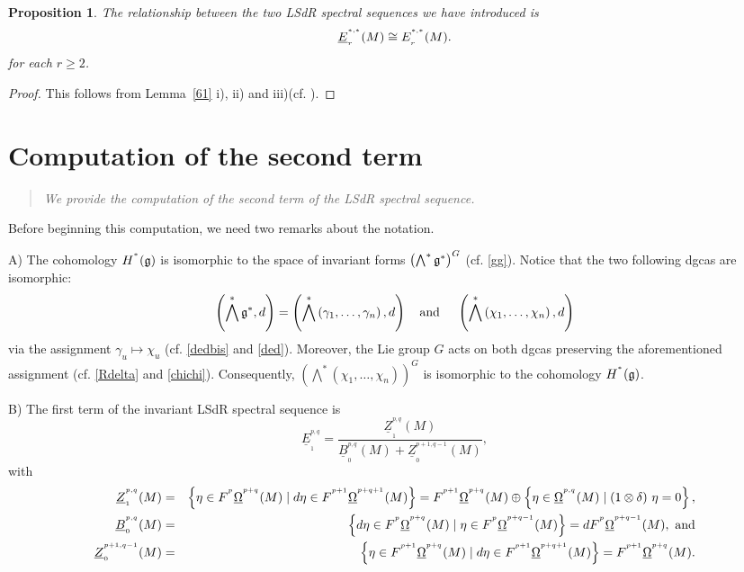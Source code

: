 \documentclass[a4paper,oneside,10pt,reqno]{amsart}
\newtheorem{proposition}[theorem]{Proposition}
\theoremstyle{definition}
\newcommand{\lemref}[1]{Lemma~\ref{#1}}
\newcommand{\g}{\noindent {\mathfrak{g}}}
\newcommand\BOm{\underline\Omega}
\newcommand\BE{\underline E}
\newcommand\BZ{\underline Z}
\newcommand\B{\underline B}
\newcommand{\id}{{\large 1}}
\newcommand{\bi}[2]{{#1}^{^{#2}}}
\newcommand{\hiru}[3]{{#1}^{^{#2}}_{_{#3}}}
\newcommand{\lau}[4]{{#1}^{^{#2}}_{_{#3}}{\left( #4 \right)}}
\newcommand{\coho}[3]{{#1}^{^{#2}}{\left( #3 \right)}}
\begin{document}
\begin{proposition}\label{61P}
The relationship between the two LSdR spectral sequences we have introduced is
$$
\lau{\BE}{*,*}{r}{M} \cong \lau{E}{*,*}{r}{M}. \hfill 
$$
for each $r\geq 2$.
\end{proposition}
\begin{proof}  
This follows from \lemref{61} i), ii) and iii)(cf.  \cite[Exercice 20, pag.78]{MR1793722}). 
 \end{proof}
 



  
  \section{Computation of the second term}
  \begin{quote}
  \emph{We provide the computation of the second term of the LSdR spectral sequence.}
  \end{quote}


Before beginning this computation, we need two remarks about the notation.

\medskip

A) The cohomology $\coho H * \g$ is isomorphic to the space of invariant forms $\left( \bigwedge^* \g^*\right)^G$ (cf. \eqref{gg}). Notice that the two following dgcas are isomorphic:
$$
\left(\bigwedge^* \g^*,d \right)  = \left(\bigwedge^* \left(\gamma_1, \ldots, \gamma_n\right),d \right) \ \ \hbox{ and } \ \ \ 
 \left(\bigwedge^* \left(\chi_1, \ldots, \chi_n\right), d\right)
 $$
via the assignment $\gamma_u \mapsto \chi_u$ (cf. \eqref{dedbis} and \eqref{ded}). Moreover, the Lie group $G$ acts on both dgcas preserving the aforementioned assignment (cf. \eqref{Rdelta} and \eqref{chichi}). Consequently, $\left(\bigwedge^* \left(\chi_1, \ldots, \chi_n\right)\right)^G$ is isomorphic to the cohomology $\coho H * \g$.

\medskip

B)  The first term of the invariant LSdR spectral sequence is
$$
   \hiru{\BE}{p,q}{1}   = \frac{    \hiru{\BZ}{p,q}{1}(M) }{  \hiru{\B}{p,q}{0}(M)  +   \hiru{\BZ}{p+1,q-1}{0}(M) },
 $$
with
  \begin{eqnarray}\label{18}
   \hiru{\BZ}{p,q}{1}(M)  &=&
    \nonumber  \left \{\eta \in \bi{F}{p}\lau{\BOm}{p+q}{}{M} \mid 	d \eta \in \bi{F}{p+1}\lau{\BOm}{p+q+1}{}{M}\right\} 
    =
    \bi{F}{p+1}\lau{\BOm}{p+q}{}{M} \oplus \left\{  \eta \in \lau{\BOm}{p,q}{}{M} \mid (\id \otimes \delta) \ \eta=0 \right\},
   \\ 
      \hiru{\B}{p,q}{0}(M)  &=& \left \{d\eta \in \bi{F}{p}\lau{\BOm}{p+q}{}{M} \mid 	\eta \in \bi{F}{p}\lau{\BOm}{p+q-1}{}{M}\right\} = d\bi{F}{p}\lau{\BOm}{p+q-1}{}{M}, \hbox{ and}
      \\  \nonumber
         \hiru{\BZ}{p+1,q-1}{0}(M)  &=& \left \{\eta \in \bi{F}{p+1}\lau{\BOm}{p+q}{}{M} \mid 	d \eta \in \bi{F}{p+1}\lau{\BOm}{p+q+1}{}{M}\right\} = \bi{F}{p+1}\lau{\BOm}{p+q}{}{M}.
         \end{eqnarray}
\end{document}
